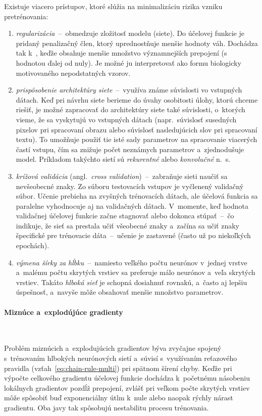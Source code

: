       Existuje viacero prístupov, ktoré slúžia na minimalizáciu rizika vzniku pretrénovania:
      \begin{enumerate}
        \item \emph{regularizácia}~--~obmedzuje zložitosť modelu (siete). Do účelovej funkcie je pridaný penalizačný člen, ktorý uprednostňuje menšie hodnoty váh. Dochádza tak k~, keďže obsahuje menšie množstvo významnejších prepojení (s hodnotou ďalej od nuly). Je možné ju interpretovať ako formu biologicky motivovaného  nepodstatných vzorov.
        \item \emph{prispôsobenie architektúry siete}~--~využíva známe súvislosti vo vstupných dátach. Keď pri návrhu siete berieme do úvahy osobitosti úlohy, ktorú chceme riešiť, je možné zapracovať do architektúry siete také súvislosti, o~ktorých vieme, že sa vyskytujú vo vstupných dátach (napr.\ súvislosť susedných pixelov pri spracovaní obrazu alebo súvislosť nasledujúcich slov pri spracovaní textu). To umožňuje použiť tie isté sady parametrov na spracovanie viacerých častí vstupu, čím sa znižuje počet neznámych parametrov a~zjednodušuje model. Príkladom takýchto sietí sú \emph{rekurentné} alebo \emph{konvolučné} n.\ s.
        \item \emph{krížová validácia} (angl.\ \emph{cross validation})~--~zabraňuje sieti naučiť sa nevšeobecné znaky. Zo súboru testovacích vstupov je vyčlenený validačný súbor. Učenie prebieha na zvyšných trénovacích dátach, ale účelová funkcia sa paralelne vyhodnocuje aj na validačných dátach. V~momente, keď hodnota validačnej účelovej funkcie začne stagnovať alebo dokonca stúpať~--~čo indikuje, že sieť sa prestala učiť všeobecné znaky a~začína sa učiť znaky špecifické pre trénovacie dáta~--~učenie je zastavené (často už po niekoľkých epochách).
        \item \emph{výmena šírky za hĺbku}~--~namiesto veľkého počtu neurónov v~jednej vrstve a~malému počtu skrytých vrstiev sa preferuje málo neurónov a~veľa skrytých vrstiev. Takáto \emph{hlboká sieť} je schopná dosiahnuť rovnakú, a~často aj lepšiu úspešnosť, a~navyše môže obsahovať menšie množstvo parametrov.
      \end{enumerate}

      \paragraph{Miznúce a~explodújúce gradienty} \

        \noindent Problém miznúcich a~explodujúcich gradientov býva zvyčajne spojený s~trénovaním hlbokých neurónových sietí a~súvisí s~využívaním reťazového pravidla (vzťah~\ref{eq:chain-rule-multi}) pri spätnom šírení chyby. Keďže pri výpočte celkového gradientu účelovej funkcie dochádza k~početnému násobeniu lokálnych gradientov pozdĺž prepojení, zvlášť pri veľkom počte skrytých vrstiev môže spôsobiť buď exponenciálny útlm k~nule alebo naopak rýchly nárast gradientu. Oba javy tak spôsobujú nestabilitu procesu trénovania.

